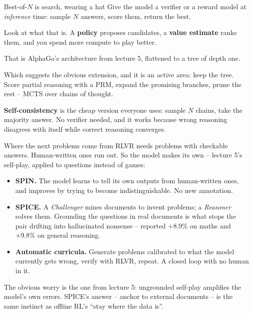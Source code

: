 \documentclass[aspectratio=169]{beamer}
\begin{document}
\begin{frame}{Best-of-$N$ is search, wearing a hat}
  \small
  Give the model a verifier or a reward model at \emph{inference} time: sample $N$ answers, score
  them, return the best.

  \vskip 8pt
  \begin{tcolorbox}[colback=armorange!12, colframe=armorange, boxrule=0.7pt, arc=2pt]
    \small
    Look at what that is. A \textbf{policy} proposes candidates, a \textbf{value estimate} ranks
    them, and you spend more compute to play better.

    \vskip 4pt
    That is AlphaGo's architecture from lecture 5, flattened to a tree of depth one.
  \end{tcolorbox}

  \vskip 8pt
  \small
  Which suggests the obvious extension, and it is an active area: keep the tree. Score partial
  reasoning with a PRM, expand the promising branches, prune the rest -- MCTS over chains of
  thought.

  \vskip 6pt
  \begin{tcolorbox}[colback=armblue!8, colframe=armblue, boxrule=0.6pt, arc=2pt]
    \small
    \textbf{Self-consistency} is the cheap version everyone uses: sample $N$ chains, take the
    majority answer. No verifier needed, and it works because wrong reasoning disagrees with
    itself while correct reasoning converges.
  \end{tcolorbox}
\end{frame}

\begin{frame}{Where the next problems come from}
  \small
  RLVR needs problems with checkable answers. Human-written ones run out. So the model makes its
  own -- lecture 5's self-play, applied to questions instead of games:

  \vskip 8pt
  \begin{itemize}\itemsep4pt
    \item \textbf{SPIN.} The model learns to tell its own outputs from human-written ones, and
          improves by trying to become indistinguishable. No new annotation.
    \item \textbf{SPICE.} A \emph{Challenger} mines documents to invent problems; a
          \emph{Reasoner} solves them. Grounding the questions in real documents is what stops
          the pair drifting into hallucinated nonsense -- reported $+8.9\%$ on maths and
          $+9.8\%$ on general reasoning.
    \item \textbf{Automatic curricula.} Generate problems calibrated to what the model currently
          gets wrong, verify with RLVR, repeat. A closed loop with no human in it.
  \end{itemize}

  \vskip 6pt
  \begin{tcolorbox}[colback=armred!8, colframe=armred, boxrule=0.6pt, arc=2pt]
    \small
    The obvious worry is the one from lecture 5: ungrounded self-play amplifies the model's own
    errors. SPICE's answer -- anchor to external documents -- is the same instinct as offline
    RL's ``stay where the data is''.
  \end{tcolorbox}
\end{frame}
\end{document}
